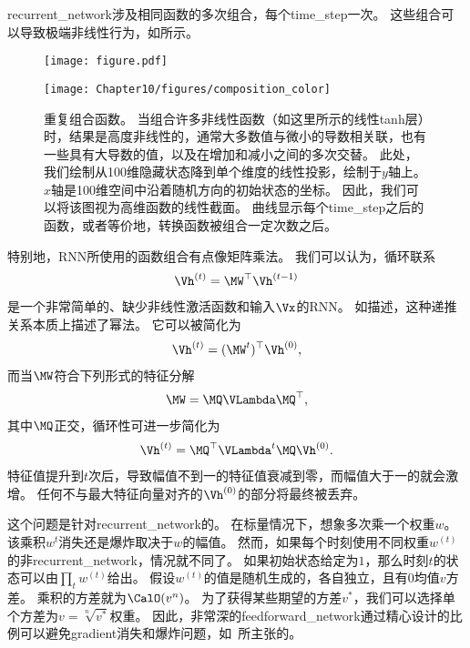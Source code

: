 
\gls{recurrent_network}涉及相同函数的多次组合，每个\gls{time_step}一次。
这些组合可以导致极端非线性行为，如所示。
\begin{figure}[!htb]
\ifOpenSource
\centerline{\texttt{[image: figure.pdf]}}
\else
\centerline{\texttt{[image: Chapter10/figures/composition\_color]}}
\fi
\caption{重复组合函数。
当组合许多非线性函数（如这里所示的线性tanh层）时，结果是高度非线性的，通常大多数值与微小的导数相关联，也有一些具有大导数的值，以及在增加和减小之间的多次交替。%
此处，我们绘制从100维隐藏状态降到单个维度的线性投影，绘制于$y$轴上。
$x$轴是100维空间中沿着随机方向的初始状态的坐标。
因此，我们可以将该图视为高维函数的线性截面。
曲线显示每个\gls{time_step}之后的函数，或者等价地，转换函数被组合一定次数之后。
}
\label{fig:chap10_composition_color}
\end{figure}

特别地，\gls{RNN}所使用的函数组合有点像矩阵乘法。
我们可以认为，循环联系
\begin{align}
 \Vh^{(t)} = \MW^\top \Vh^{(t-1)}
\end{align}
是一个非常简单的、缺少非线性激活函数和输入$\Vx$的\gls{RNN}。
如描述，这种递推关系本质上描述了幂法。
它可以被简化为
\begin{align}
 \Vh^{(t)} = (\MW^t)^\top \Vh^{(0)},
\end{align}
而当$\MW$符合下列形式的特征分解
\begin{align}
 \MW = \MQ \VLambda \MQ^\top,
\end{align}
其中$\MQ$正交，循环性可进一步简化为
\begin{align}
 \Vh^{(t)} = \MQ^\top \VLambda^t \MQ \Vh^{(0)}.
\end{align}
特征值提升到$t$次后，导致幅值不到一的特征值衰减到零，而幅值大于一的就会激增。
任何不与最大特征向量对齐的$\Vh^{(0)}$的部分将最终被丢弃。


这个问题是针对\gls{recurrent_network}的。
在标量情况下，想象多次乘一个权重$w$。
该乘积$w^t$消失还是爆炸取决于$w$的幅值。
然而，如果每个时刻使用不同权重$w^{(t)}$的非\gls{recurrent_network}，情况就不同了。
如果初始状态给定为$1$，那么时刻$t$的状态可以由$\prod_t w^{(t)}$给出。
假设$w^{(t)}$的值是随机生成的，各自独立，且有$0$均值$v$方差。
乘积的方差就为$\CalO(v^n)$。
为了获得某些期望的方差$v^*$，我们可以选择单个方差为$v=\sqrt[n]{v^*}$权重。
因此，非常深的\gls{feedforward_network}通过精心设计的比例可以避免\gls{gradient}消失和爆炸问题，如~\cite{Sussillo14}所主张的。

